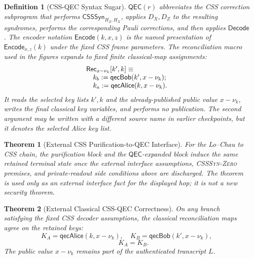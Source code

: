 \documentclass[conference,compsoc]{IEEEtran}
\newtheorem{definition}{Definition}
\newtheorem{theorem}{Theorem}
\begin{document}
\begin{definition}[CSS-QEC Syntax Sugar]
\(\mathsf{QEC}(r)\) abbreviates the CSS correction subprogram that performs
\(\mathsf{CSSSyn}_{H_Z,H_X}\), applies \(D_X,D_Z\) to the resulting syndromes,
performs the corresponding Pauli corrections, and then applies
\(\mathsf{Decode}\). The encoder notation
\(\mathsf{Encode}(k,x,z)\) is the named presentation of
\(\mathsf{Encode}_{x,z}(k)\) under the fixed CSS frame parameters.
The reconciliation macro used in the figures expands to fixed finite
classical-map assignments:
\[
\begin{array}{@{}l@{}}
\mathsf{Rec}_{x-\nu_k}[k',k]\equiv\\
\quad k_b:=\mathsf{qecBob}(k',x-\nu_k);\\
\quad k_a:=\mathsf{qecAlice}(k,x-\nu_k).
\end{array}
\]
It reads the selected key lists \(k',k\) and the already-published public
value \(x-\nu_k\), writes the final classical key variables, and performs no
publication. The second argument may be written with a different source name in
earlier checkpoints, but it denotes the selected Alice key list.
\end{definition}

\begin{theorem}[External CSS Purification-to-QEC Interface]
\label{thm:css-purification-qec}
For the Lo--Chau to CSS chain, the purification block and the
\(\mathsf{QEC}\)-expanded block induce the same retained terminal state once the
external interface assumptions, \textsc{CSSSyn-Zero} premises, and private-readout side
conditions above are discharged. The theorem is used only as an external
interface fact for the displayed hop; it is not a new security theorem.
\end{theorem}

\begin{theorem}[External Classical CSS-QEC Correctness]
\label{thm:classical-css-qec}
On any branch satisfying the fixed CSS decoder assumptions, the classical
reconciliation maps agree on the retained keys:
\[
K_A=\mathsf{qecAlice}(k,x-\nu_k),
\quad
K_B=\mathsf{qecBob}(k',x-\nu_k),\]\[
\qquad
K_A=K_B .
\]
The public value \(x-\nu_k\) remains part of the authenticated transcript \(L\).
\end{theorem}
\end{document}
